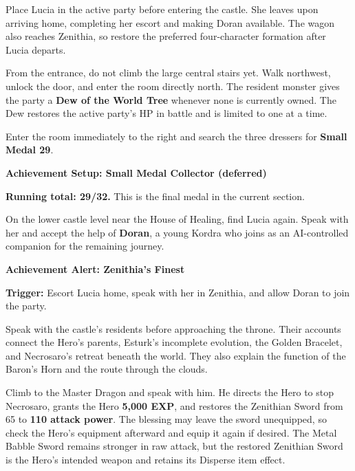 \documentclass[
  american,
  10pt,
  letterpaper,
  oneside,
  open=any]{scrreprt}
\newcounter{none} %
\begin{document}
Place Lucia in the active party before entering the castle. She leaves
upon arriving home, completing her escort and making Doran available.
The wagon also reaches Zenithia, so restore the preferred four-character
formation after Lucia departs.

From the entrance, do not climb the large central stairs yet. Walk
northwest, unlock the door, and enter the room directly north. The
resident monster gives the party a \textbf{Dew of the World Tree}
whenever none is currently owned. The Dew restores the active party's HP
in battle and is limited to one at a time.

Enter the room immediately to the right and search the three dressers
for \textbf{Small Medal 29}.

\begin{achievementsetup}

\textbf{Achievement Setup: Small Medal Collector (deferred)}

\textbf{Running total: 29/32.} This is the final medal in the current
section.

\end{achievementsetup}

On the lower castle level near the House of Healing, find Lucia again.
Speak with her and accept the help of \textbf{Doran}, a young Kordra who
joins as an AI-controlled companion for the remaining journey.

\begin{achievementalert}

\textbf{Achievement Alert: Zenithia's Finest}

\textbf{Trigger:} Escort Lucia home, speak with her in Zenithia, and
allow Doran to join the party.

\end{achievementalert}

Speak with the castle's residents before approaching the throne. Their
accounts connect the Hero's parents, Esturk's incomplete evolution, the
Golden Bracelet, and Necrosaro's retreat beneath the world. They also
explain the function of the Baron's Horn and the route through the
clouds.

Climb to the Master Dragon and speak with him. He directs the Hero to
stop Necrosaro, grants the Hero \textbf{5,000 EXP}, and restores the
Zenithian Sword from 65 to \textbf{110 attack power}. The blessing may
leave the sword unequipped, so check the Hero's equipment afterward and
equip it again if desired. The Metal Babble Sword remains stronger in
raw attack, but the restored Zenithian Sword is the Hero's intended
weapon and retains its Disperse item effect.
\end{document}
